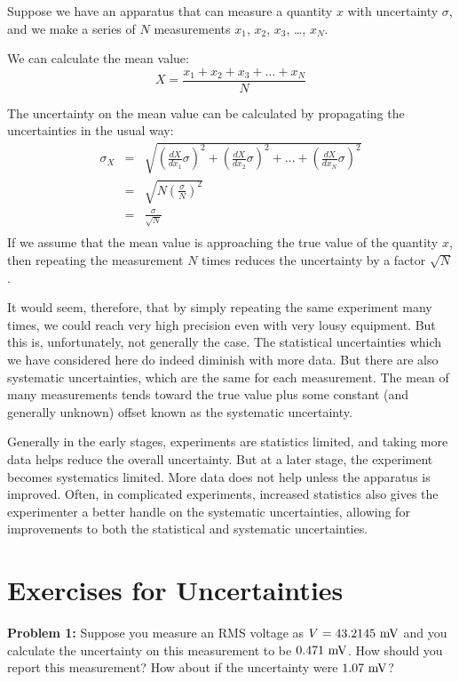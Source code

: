 \documentclass[12pt,oneside]{book}
\begin{document}
Suppose we have an apparatus that can measure a quantity $x$ with uncertainty $\sigma$, and we make a series of $N$ measurements $x_1$, $x_2$, $x_3$, \ldots, $x_N$.

We can calculate the mean value:
\begin{displaymath}
X = \frac{x_1 + x_2 + x_3 + \ldots + x_N}{N}
\end{displaymath}

The uncertainty on the mean value can be calculated by propagating the uncertainties in the usual way:
\begin{eqnarray*}
\sigma_X &=& \sqrt{\left(\frac{dX}{dx_1} \sigma \right)^2 
+ \left(\frac{dX}{dx_2} \sigma \right)^2 +  \ldots + \left(\frac{dX}{dx_N} \sigma \right)^2 } \\
&=& \sqrt{N \left(\frac{\sigma}{N} \right)^2}\\ 
&=& \frac{\sigma}{\sqrt{N}} \\
\end{eqnarray*}
If we assume that the mean value is approaching the true value of the quantity $x$, then repeating the measurement $N$ times reduces the uncertainty by a factor $\sqrt{N}$.

It would seem, therefore, that by simply repeating the same experiment many times, we could reach very high precision even with very lousy equipment.  But this is, unfortunately, not generally the case.  The statistical uncertainties which we have considered here do indeed diminish with more data.  But there are also systematic uncertainties, which are the same for each measurement.  The mean of many measurements tends toward the true value plus some constant (and generally unknown) offset known as the systematic uncertainty.  

Generally in the early stages, experiments are statistics limited, and taking more data helps reduce the overall uncertainty.  But at a later stage, the experiment becomes systematics limited.  More data does not help unless the apparatus is improved.  Often, in complicated experiments, increased statistics also gives the experimenter a better handle on the systematic uncertainties, allowing for improvements to both the statistical and systematic uncertainties.

\section{Exercises for Uncertainties}

\noindent
{\bf Problem 1:}  Suppose you measure an RMS voltage as $V = 43.2145~\rm mV$ and you calculate the uncertainty on this measurement to be $0.471~\rm mV$.  How should you report this measurement?  How about if the uncertainty were $1.07~\rm mV$? \\ \vskip 0.25cm
\end{document}
